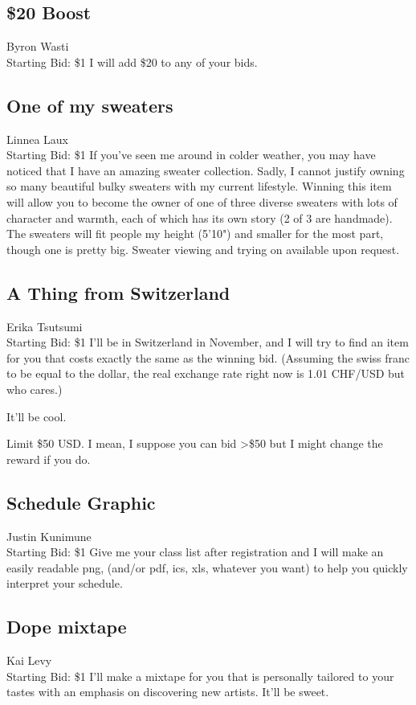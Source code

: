 \documentclass[11pt]{article}
\begin{document}
\subsection{\$20 Boost}
Byron Wasti
\\
Starting Bid: \$1
\newline
I will add \$20 to any of your bids.
\subsection{One of my sweaters}
Linnea Laux
\\
Starting Bid: \$1
\newline
If you've seen me around in colder weather, you may have noticed that I have an amazing sweater collection. Sadly, I cannot justify owning so many beautiful bulky sweaters with my current lifestyle. Winning this item will allow you to become the owner of one of three diverse sweaters with lots of character and warmth, each of which has its own story (2 of 3 are handmade). The sweaters will fit people my height (5'10") and smaller for the most part, though one is pretty big. Sweater viewing and trying on available upon request.
\subsection{A Thing from Switzerland}
Erika Tsutsumi
\\
Starting Bid: \$1
\newline
I'll be in Switzerland in November, and I will try to find an item for you that costs exactly the same as the winning bid. (Assuming the swiss franc to be equal to the dollar, the real exchange rate right now is 1.01 CHF/USD but who cares.)

It'll be cool. 

Limit \$50 USD. I mean, I suppose you can bid \textgreater \$50 but I might change the reward if you do.
\subsection{Schedule Graphic}
Justin Kunimune
\\
Starting Bid: \$1
\newline
Give me your class list after registration and I will make an easily readable png, (and/or pdf, ics, xls, whatever you want) to help you quickly interpret your schedule.
\subsection{Dope mixtape}
Kai Levy
\\
Starting Bid: \$1
\newline
I'll make a mixtape for you that is personally tailored to your tastes with an emphasis on discovering new artists. It'll be sweet.
\end{document}
